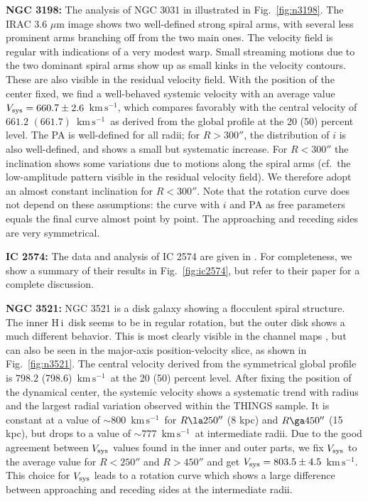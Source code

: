 \documentclass[usenatbib,usegraphicx,apjfonts,floatfix]{emulateapj}
\newcommand{\kms}{\ensuremath{\,\mbox{km}\,\mbox{s}^{-1}}}
\newcommand{\HI}{H\,{\sc i}}
\begin{document}
{\bf NGC 3198:} The analysis of NGC 3031 in illustrated in
Fig.~\ref{fig:n3198}.  The IRAC 3.6 $\mu$m image shows two
well-defined strong spiral arms, with several less prominent arms
branching off from the two main ones.  The velocity field is regular
with indications of a very modest warp. Small streaming motions due to
the two dominant spiral arms show up as small kinks in the velocity
contours. These are also visible in the residual velocity field.  With
the position of the center fixed, we find a well-behaved systemic
velocity with an average value $V_{\rm sys} = 660.7 \pm 2.6$ \kms,
which compares favorably with the central velocity of $661.2$
$(661.7)$ \kms\ as derived from the global profile at the 20 (50)
percent level.
The PA is well-defined for all radii; for $R>300''$, the distribution
of $i$ is also well-defined, and shows a small but systematic
increase. For $R<300''$ the inclination shows some variations due to
motions along the spiral arms (cf.\ the low-amplitude pattern visible
in the residual velocity field). We therefore adopt an almost constant
inclination for $R<300''$. Note that the rotation curve does not
depend on these assumptions: the curve with $i$ and PA as free
parameters equals the final curve almost point by point. The
approaching and receding sides are very symmetrical.

{\bf IC 2574:} The data and analysis of IC 2574 are given in
\citet{oh2007}. For completeness, we show a summary of their results
in Fig.~\ref{fig:ic2574}, but refer to their paper for a complete
discussion.

{\bf NGC 3521: } NGC 3521 is a disk galaxy showing a flocculent spiral
structure. The inner \HI\ disk seems to be in regular rotation, but
the outer disk shows a much different behavior. This is most clearly
visible in the channel maps \citep[see][]{THINGS1}, but can also be
seen in the major-axis position-velocity slice, as shown in
Fig.~\ref{fig:n3521}. The central velocity derived from the
symmetrical global profile is $798.2$ (798.6) \kms\ at the 20 (50)
percent level.  After fixing the position of the dynamical center, the
systemic velocity shows a systematic trend with radius and the largest
radial variation observed within the THINGS sample.  It is constant at
a value of $\sim 800$ \kms\ for $R \la 250''$ (8 kpc) and $R\ga 450''$
(15 kpc), but drops to a value of $\sim 777$ \kms\ at intermediate
radii.  Due to the good agreement between $V_{\rm sys}$ values found
in the inner and outer parts, we fix $V_{\rm sys}$ to the average
value for $R<250''$ and $R>450''$ and get $V_{\rm sys} = 803.5 \pm
4.5$ \kms.  This choice for $V_{\rm sys}$ leads to a rotation curve
which shows a large difference between approaching and receding sides
at the intermediate radii.
\end{document}
